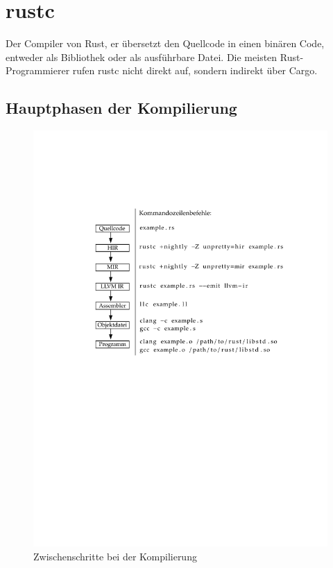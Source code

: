 \section{rustc}

Der Compiler von Rust, er übersetzt den Quellcode in einen binären Code, entweder als Bibliothek oder als ausführbare Datei. Die meisten Rust-Programmierer rufen rustc nicht direkt auf, sondern indirekt über Cargo. \cite{RustcBook}

\subsection{Hauptphasen der Kompilierung}

\begin{figure}[htbp]
    \centering 
    \includegraphics[scale=1.05]{Toolchain/Compiler.pdf}
    \caption{Zwischenschritte bei der Kompilierung}
    \label{fig:zwischenscritte}
\end{figure}

